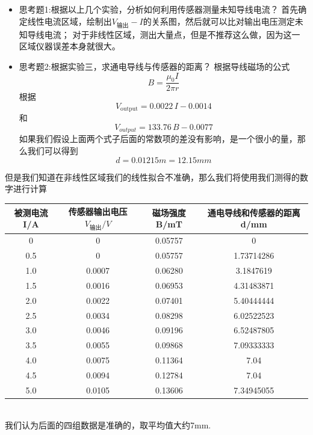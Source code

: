 \documentclass[10pt,a4paper]{article}
\begin{document}
	\begin{itemize}
		\item 思考题1:根据以上几个实验，分析如何利用传感器测量未知导线电流？
		首先确定线性电流区域，绘制出\(V_{\text{输出}}-I\)的关系图，然后就可以比对输出电压测定未知导线电流；
		对于非线性区域，测出大量点，但是不推荐这么做，因为这一区域仪器误差本身就很大。
		\item 思考题2:根据实验三，求通电导线与传感器的距离？
		根据导线磁场的公式
		\begin{equation}
			B = \frac{\mu_0 I}{2\pi r}
		\end{equation}
		根据
		\begin{equation}
			V_{\text{output}} = 0.0022\,I - 0.0014
		\end{equation}
		和
		\begin{equation}
			V_{output} = 133.76\,B - 0.0077
		\end{equation}
		如果我们假设上面两个式子后面的常数项的差没有影响，是一个很小的量，那么我们可以得到
		\begin{equation}
			d = 0.01215m = 12.15mm
		\end{equation}
	\end{itemize}
	但是我们知道在非线性区域我们的线性拟合不准确，那么我们将使用我们测得的数字进行计算\\
	\begin{tabular}{|c|c|c|c|}
			\hline
			被测电流 I/A&传感器输出电压 \(V_{\text{输出}}/V\)&磁场强度B/mT&通电导线和传感器的距离d/mm\\
			\hline
			0& 0  & 0.05757 & 0 \\
			\hline
			0.5& 0  & 0.05757 & 1.73714286 \\
			\hline
			1.0& 0.0007  & 0.06280 & 3.1847619 \\
			\hline
			1.5& 0.0016  & 0.06953 & 4.31483871 \\
			\hline
			2.0& 0.0022  & 0.07401 & 5.40444444 \\
			\hline
			2.5& 0.0034  & 0.08298 & 6.02522523 \\
			\hline
			3.0& 0.0046  & 0.09196 & 6.52487805 \\
			\hline
			3.5& 0.0055  & 0.09868 & 7.09333333 \\
			\hline
			4.0& 0.0075  & 0.11364 & 7.04 \\
			\hline
			4.5& 0.0094  & 0.12784 & 7.04 \\
			\hline
			5.0& 0.0105  & 0.13606 & 7.34945055 \\
			\hline
		\end{tabular}\\
		我们认为后面的四组数据是准确的，取平均值大约7mm.
\end{document}
